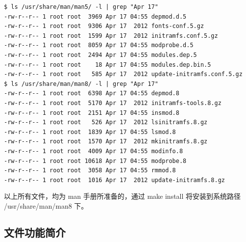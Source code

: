 {\begin{shaded}\begin{verbatim}
$ ls /usr/share/man/man5/ -l | grep "Apr 17"
-rw-r--r-- 1 root root  3969 Apr 17 04:55 depmod.d.5
-rw-r--r-- 1 root root  9306 Apr 17  2012 fonts-conf.5.gz
-rw-r--r-- 1 root root  1599 Apr 17  2012 initramfs.conf.5.gz
-rw-r--r-- 1 root root  8059 Apr 17 04:55 modprobe.d.5
-rw-r--r-- 1 root root  2494 Apr 17 04:55 modules.dep.5
-rw-r--r-- 1 root root    18 Apr 17 04:55 modules.dep.bin.5
-rw-r--r-- 1 root root   585 Apr 17  2012 update-initramfs.conf.5.gz
$ ls /usr/share/man/man8/ -l | grep "Apr 17"
-rw-r--r-- 1 root root  6398 Apr 17 04:55 depmod.8
-rw-r--r-- 1 root root  5170 Apr 17  2012 initramfs-tools.8.gz
-rw-r--r-- 1 root root  2151 Apr 17 04:55 insmod.8
-rw-r--r-- 1 root root   526 Apr 17  2012 lsinitramfs.8.gz
-rw-r--r-- 1 root root  1839 Apr 17 04:55 lsmod.8
-rw-r--r-- 1 root root  1570 Apr 17  2012 mkinitramfs.8.gz
-rw-r--r-- 1 root root  4009 Apr 17 04:55 modinfo.8
-rw-r--r-- 1 root root 10618 Apr 17 04:55 modprobe.8
-rw-r--r-- 1 root root  3058 Apr 17 04:55 rmmod.8
-rw-r--r-- 1 root root  1016 Apr 17  2012 update-initramfs.8.gz
\end{verbatim}\end{shaded}}
以上所有文件，均为 man 手册所准备的，通过 make install 将安装到系统路径
/usr/share/man/man8 下。

\subsection{文件功能简介}

